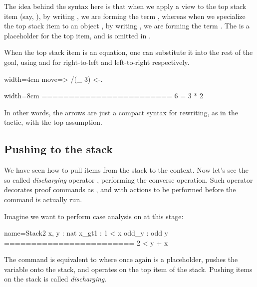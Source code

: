 The idea behind the syntax here is that when we apply a view  to
the top stack item (say, ), by writing , we are
forming the term , whereas
when we specialize the top stack item  to an object ,
by writing , we are forming the term .  The \C{_}
is a placeholder for the top item, and is
omitted in .

When the top stack item is an equation, one can substitute it into
the rest of the goal, using \C{<-} and \C{->} for
right-to-left and left-to-right respectively.

\begin{coq-left}{}{width=4cm}
move=> /(_ 3) <-.
$~$
\end{coq-left}
\begin{coqout-right}{}{width=8cm}
========================
6 = 3 * 2
\end{coqout-right}

In other words, the arrows are just a compact syntax for rewriting,
as in the  tactic, with the top assumption.

\subsection{Pushing to the stack}

We have seen how to pull items from the stack to the context.
Now let's see the so called \emph{discharging} operator \C{:}, performing
the converse operation.
Such operator decorates
proof commands as ,  and 
 with actions to be performed before the command is actually run.


Imagine we want to perform case analysis on  at this stage:

\begin{coqout}{name=Stack2}{}
 x, y : nat
 x_gt1 : 1 < x
 odd_y : odd y
 ========================
 2 < y + x
\end{coqout}

The command  is equivalent to
 where  once again is a placeholder,
 pushes the  variable onto the stack, and 
operates on the top item of the stack.
Pushing items on the stack is called \emph{discharging}.

